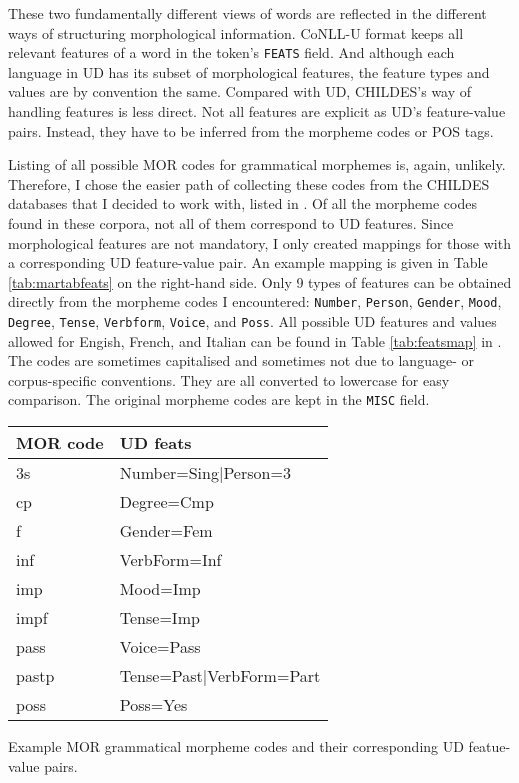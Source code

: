 These two fundamentally different views of words are reflected in the different ways of structuring morphological information. CoNLL-U format keeps all relevant features of a word in the token's \texttt{FEATS} field. And although each language in UD has its subset of morphological features, the feature types and values are by convention the same. Compared with UD, CHILDES's way of handling features is less direct. Not all features are explicit as UD's feature-value pairs. Instead, they have to be inferred from the morpheme codes or POS tags.

Listing of all possible MOR codes for grammatical morphemes is, again, unlikely. Therefore, I chose the easier path of collecting these codes from the CHILDES databases that I decided to work with, listed in . Of all the morpheme codes found in these corpora, not all of them correspond to UD features. Since morphological features are not mandatory, I only created mappings for those with a corresponding UD feature-value pair. An example mapping is given in Table \ref{tab:martabfeats} on the right-hand side. Only 9 types of features can be obtained directly from the morpheme codes I encountered: \texttt{Number}, \texttt{Person}, \texttt{Gender}, \texttt{Mood}, \texttt{Degree}, \texttt{Tense}, \texttt{Verbform}, \texttt{Voice}, and \texttt{Poss}. All possible UD features and values allowed for Engish, French, and Italian can be found in Table \ref{tab:featsmap} in . The codes are sometimes capitalised and sometimes not due to language- or corpus-specific conventions. They are all converted to lowercase for easy comparison. The original morpheme codes are kept in the \texttt{MISC} field.
\begin{margintable}[1\baselineskip]
\begin{tabularx}{1\textwidth}{@{}ll@{}}
\toprule
\textbf{MOR code} & \textbf{UD feats}\\ \midrule
	3s & Number=Sing|Person=3\\
	cp & Degree=Cmp\\
	f & Gender=Fem\\
	inf & VerbForm=Inf\\
	imp & Mood=Imp\\
	impf & Tense=Imp\\
	pass & Voice=Pass\\
	pastp & Tense=Past|VerbForm=Part\\
	poss & Poss=Yes\\\bottomrule
\end{tabularx}
\caption{\label{tab:martabfeats}Example MOR grammatical morpheme codes and their corresponding UD featue-value pairs.}
\footnotesize
\end{margintable}


